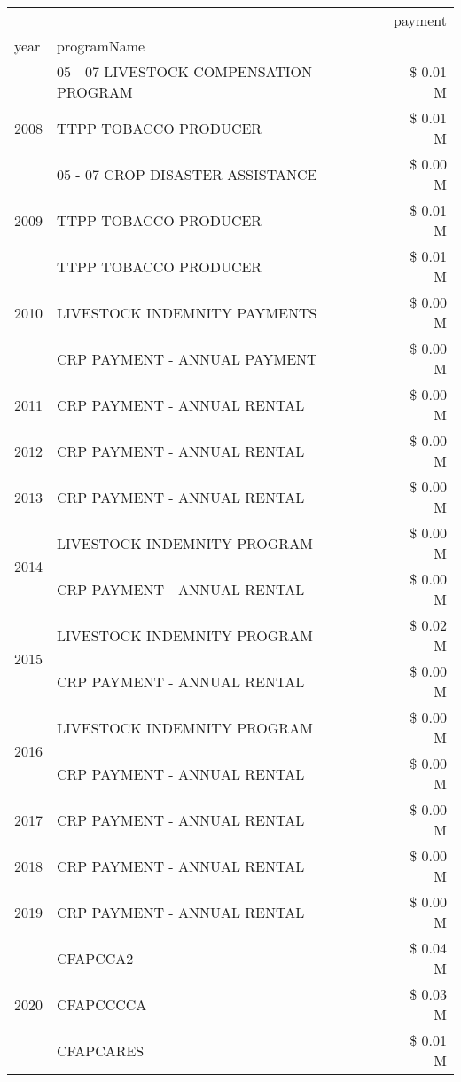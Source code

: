 \begin{tabular}{llr}
\toprule
 &  & payment \\
year & programName &  \\
\midrule
\multirow[t]{3}{*}{2008} & 05 - 07 LIVESTOCK COMPENSATION PROGRAM & \$ 0.01 M \\
 & TTPP TOBACCO PRODUCER & \$ 0.01 M \\
 & 05 - 07 CROP DISASTER ASSISTANCE & \$ 0.00 M \\
\cline{1-3}
2009 & TTPP TOBACCO PRODUCER & \$ 0.01 M \\
\cline{1-3}
\multirow[t]{3}{*}{2010} & TTPP TOBACCO PRODUCER & \$ 0.01 M \\
 & LIVESTOCK INDEMNITY PAYMENTS & \$ 0.00 M \\
 & CRP PAYMENT - ANNUAL PAYMENT & \$ 0.00 M \\
\cline{1-3}
2011 & CRP PAYMENT - ANNUAL RENTAL & \$ 0.00 M \\
\cline{1-3}
2012 & CRP PAYMENT - ANNUAL RENTAL & \$ 0.00 M \\
\cline{1-3}
2013 & CRP PAYMENT - ANNUAL RENTAL & \$ 0.00 M \\
\cline{1-3}
\multirow[t]{2}{*}{2014} & LIVESTOCK INDEMNITY PROGRAM & \$ 0.00 M \\
 & CRP PAYMENT - ANNUAL RENTAL & \$ 0.00 M \\
\cline{1-3}
\multirow[t]{2}{*}{2015} & LIVESTOCK INDEMNITY PROGRAM & \$ 0.02 M \\
 & CRP PAYMENT - ANNUAL RENTAL & \$ 0.00 M \\
\cline{1-3}
\multirow[t]{2}{*}{2016} & LIVESTOCK INDEMNITY PROGRAM & \$ 0.00 M \\
 & CRP PAYMENT - ANNUAL RENTAL & \$ 0.00 M \\
\cline{1-3}
2017 & CRP PAYMENT - ANNUAL RENTAL & \$ 0.00 M \\
\cline{1-3}
2018 & CRP PAYMENT - ANNUAL RENTAL & \$ 0.00 M \\
\cline{1-3}
2019 & CRP PAYMENT - ANNUAL RENTAL & \$ 0.00 M \\
\cline{1-3}
\multirow[t]{3}{*}{2020} & CFAPCCA2 & \$ 0.04 M \\
 & CFAPCCCCA & \$ 0.03 M \\
 & CFAPCARES & \$ 0.01 M \\
\cline{1-3}
\bottomrule
\end{tabular}
